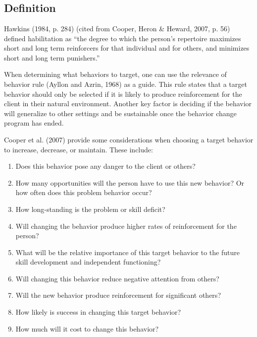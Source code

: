 \section[\fouriSix{}]{\fouriSix{}%
              }
\subsection{Definition}
Hawkins (1984, p. 284) (cited from Cooper, Heron \& Heward, 2007, p. 56) defined habilitation as ``the degree to which the person's repertoire maximizes short and long term reinforcers for that individual and for others, and minimizes short and long term punishers.''

When determining what behaviors to target, one can use the relevance of behavior rule (Ayllon and Azrin, 1968) as a guide. This rule states that a target behavior should only be selected if it is likely to produce reinforcement for the client in their natural environment. Another key factor is deciding if the behavior will generalize to other settings and be sustainable once the behavior change program has ended. 

Cooper et al. (2007) provide some considerations when choosing a target behavior to increase, decrease, or maintain. These include:
\begin{enumerate}
\item Does this behavior pose any danger to the client or others?
\item How many opportunities will the person have to use this new behavior? Or how often does this problem behavior occur?
\item How long-standing is the problem or skill deficit?
\item Will changing the behavior produce higher rates of reinforcement for the person?
\item What will be the relative importance of this target behavior to the future skill development and independent functioning?
\item Will changing this behavior reduce negative attention from others?
\item Will the new behavior produce reinforcement for significant others?
\item How likely is success in changing this target behavior?
\item How much will it cost to change this behavior?
\end{enumerate}
%
